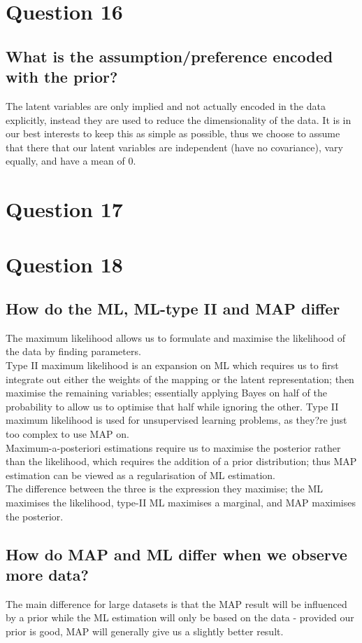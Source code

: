 \documentclass[a4paper, 9pt]{article}
\begin{document}
\section*{Question 16}
\subsection*{What is the assumption/preference encoded with the prior?}
The latent variables are only implied and not actually encoded in the data explicitly, instead they are used to reduce the dimensionality of the data. It is in our best interests to keep this as simple as possible, thus we choose to assume that there that our latent variables are independent (have no covariance), vary equally, and have a mean of 0.

\section*{Question 17}

\section*{Question 18}
\subsection{How do the ML, ML-type II and MAP differ}
The maximum likelihood allows us to formulate and maximise the likelihood of the data by finding parameters. \\
Type II maximum likelihood is an expansion on ML which requires us to first integrate out either the weights of the mapping or the latent representation; then maximise the remaining variables; essentially applying Bayes on half of the probability to allow us to optimise that half while ignoring the other. Type II maximum likelihood is used for unsupervised learning problems, as they?re just too complex to use MAP on. \\
Maximum-a-posteriori estimations require us to maximise the posterior rather than the likelihood, which requires the addition of a prior distribution; thus MAP estimation can be viewed as a regularisation of ML estimation. \\
The difference between the three is the expression they maximise; the ML maximises the likelihood, type-II ML maximises a marginal, and MAP maximises the posterior. 
\subsection*{How do MAP and ML differ when we observe more data?}
The main difference for large datasets is that the MAP result will be influenced by a prior while the ML estimation will only be based on the data - provided our prior is good, MAP will generally give us a slightly better result. 
\end{document}
